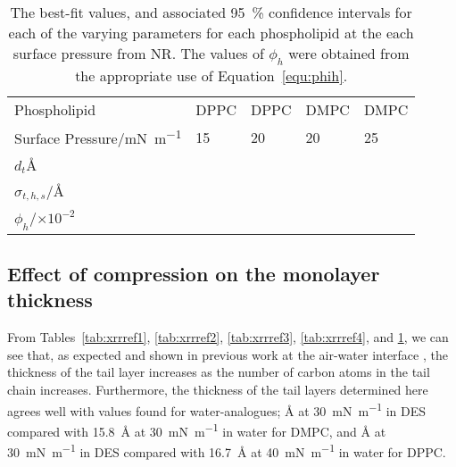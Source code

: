\begin{table}
    \centering
    \small
    \caption{The best-fit values, and associated \SI{95}{\percent} confidence intervals for each of the varying parameters for each phospholipid at the each surface pressure from NR. The values of $\phi_h$ were obtained from the appropriate use of Equation~\ref{equ:phih}.}
    \label{tab:nrref}
    \begin{tabular}{l | l l l l}
        \toprule
        Phospholipid & DPPC & DPPC & DMPC & DMPC \\
        Surface Pressure/\si{\milli\newton\per\meter} & 15 & 20 & 20 & 25 \\
        \midrule
        $d_t$\si{\angstrom} &  &  &  &  \\
        $\sigma_{t,h,s}$/\si{\angstrom} &  &  &  &  \\
        \midrule
        $\phi_h$/$\times 10^{-2}$ &  &  &  &  \\
        \bottomrule
    \end{tabular}
\end{table}
%

\subsection{Effect of compression on the monolayer thickness}
From Tables~\ref{tab:xrrref1}, \ref{tab:xrrref2}, \ref{tab:xrrref3}, \ref{tab:xrrref4}, and \ref{tab:nrref}, we can see that, as expected and shown in previous work at the air-water interface \cite{mohwald_phospholipid_1990,vaknin_structural_1991}, the thickness of the tail layer increases as the number of carbon atoms in the tail chain increases.
Furthermore, the thickness of the tail layers determined here agrees well with values found for water-analogues; \si{\angstrom} at \SI{30}{\milli\newton\per\meter} in DES compared with \SI{15.8}{\angstrom} at \SI{30}{\milli\newton\per\meter} in water for DMPC, and \si{\angstrom} at \SI{30}{\milli\newton\per\meter} in DES compared with \SI{16.7}{\angstrom} at \SI{40}{\milli\newton\per\meter} in water for DPPC.

